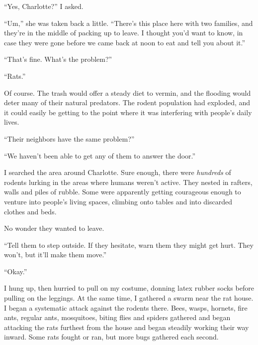``Yes, Charlotte?'' I asked.



``Um,'' she was taken back a little.  ``There's this place here with two families, and they're in the middle of packing up to leave.  I thought you'd want to know, in case they were gone before we came back at noon to eat and tell you about it.''



``That's fine.  What's the problem?''



``Rats.''



Of course.  The trash would offer a steady diet to vermin, and the flooding would deter many of their natural predators.  The rodent population had exploded, and it could easily be getting to the point where it was interfering with people's daily lives.



``Their neighbors have the same problem?''



``We haven't been able to get any of them to answer the door.''



I searched the area around Charlotte.  Sure enough, there were \emph{hundreds} of rodents lurking in the areas where humans weren't active.  They nested in rafters, walls and piles of rubble.  Some were apparently getting courageous enough to venture into people's living spaces, climbing onto tables and into discarded clothes and beds.



No wonder they wanted to leave.



``Tell them to step outside.  If they hesitate, warn them they might get hurt.  They won't, but it'll make them move.''



``Okay.''



I hung up, then hurried to pull on my costume, donning latex rubber socks before pulling on the leggings.  At the same time, I gathered a swarm near the rat house.  I began a systematic attack against the rodents there.  Bees, wasps, hornets, fire ants, regular ants, mosquitoes, biting flies and spiders gathered and began attacking the rats furthest from the house and began steadily working their way inward.  Some rats fought or ran, but more bugs gathered each second.



